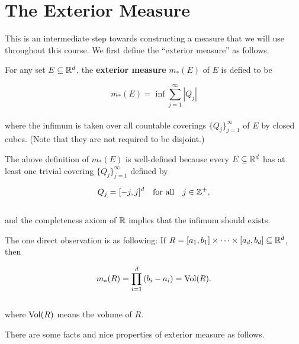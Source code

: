 \documentclass[12pt, a4paper, openany, twoside]{book}
\theoremstyle{definition}
\theoremstyle{remark}
\theoremstyle{plain}
\numberwithin{equation}{section}
\begin{document}
\newpage
\section{The Exterior Measure}\mbox{}

This is an intermediate step towards constructing a measure that we will use throughout this course. We first define the ``exterior measure'' as follows.
\vspace{5mm}
\begin{tcolorbox}[colback=yellow!10!white,colframe=blue!75!black,title=Definition 1.2.1]\label{Definition 1.2.1}
    For any set $E\subseteq{\mathbb {R}}^d$, the \textbf{exterior measure} $m_*(E)$ of $E$ is defied to be

    \[m_*(E)=\inf{\sum_{j=1}^{\infty}{|Q_j|}}\]
    \\
    where the infimum is taken over all countable coverings $\{Q_j\}_{j=1}^{\infty}$ of $E$ by closed cubes. (Note that they are not required to be disjoint.)
\end{tcolorbox}
\vspace{5mm}
The above definition of $m_*(E)$ is well-defined because every $E\subseteq{\mathbb {R}}^d$ has at least one trivial covering $\{Q_j\}_{j=1}^{\infty}$ defined by

\[Q_j=[-j,j]^d\quad\text{for all}\quad j\in{\mathbb {Z}}^+,\]
\\
and the completeness axiom of ${\mathbb {R}}$ implies that the infimum should exists.

The one direct observation is as following: If $R=[a_1,b_1]\times\cdots\times [a_d,b_d]\subseteq{\mathbb {R}}^d$, then

\[m_*(R)=\prod_{i=1}^{d}{(b_i-a_i)}={\mathrm{Vol}}(R).\]
\\
where ${\mathrm{Vol}}(R)$ means the volume of $R$. 

\vspace{5mm}
There are some facts and nice properties of exterior measure as follows.
\end{document}
